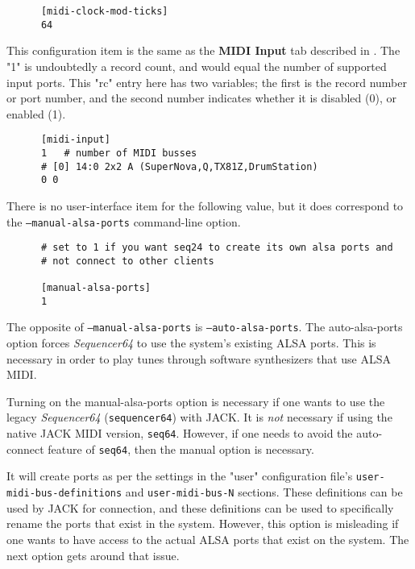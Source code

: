    \begin{verbatim}
      [midi-clock-mod-ticks]
      64
   \end{verbatim}

   This configuration item is the same as the 
   \textbf{MIDI Input} tab described in
   .
   The "1" is undoubtedly a record count, and would equal the number of
   supported input ports.
   This "rc" entry here has two variables; the first is the record number or
   port number, and the second number indicates whether it is disabled (0),
   or enabled (1).

   \begin{verbatim}
      [midi-input]
      1   # number of MIDI busses
      # [0] 14:0 2x2 A (SuperNova,Q,TX81Z,DrumStation)
      0 0
   \end{verbatim}

   There is no user-interface item for the following value, but
   it does correspond to the \texttt{--manual-alsa-ports} command-line
   option.

   \begin{verbatim}
      # set to 1 if you want seq24 to create its own alsa ports and
      # not connect to other clients

      [manual-alsa-ports]
      1
   \end{verbatim}

   The opposite of \texttt{--manual-alsa-ports}
   is \texttt{--auto-alsa-ports}.  The auto-alsa-ports option
   forces \textsl{Sequencer64} to use the system's existing ALSA ports.
   This is necessary in order to play tunes through software synthesizers that
   use ALSA MIDI.

   Turning on the manual-alsa-ports option is necessary if one
   wants to use the legacy \textsl{Sequencer64} (\texttt{sequencer64})
   with JACK.
   It is \textsl{not} necessary if using the native JACK MIDI version,
   \texttt{seq64}.
   However, if one needs to avoid the auto-connect feature of \texttt{seq64},
   then the manual option is necessary.

   It will create ports as per the settings in the "user" configuration file's
   \texttt{user-midi-bus-definitions} and \texttt{user-midi-bus-N} sections.
   These definitions can be used by JACK for connection, and these definitions
   can be used to specifically rename the ports that exist in the system.
   However, this option is misleading if one wants to have access to the
   actual ALSA ports that exist on the system.
   The next option gets around that issue.

